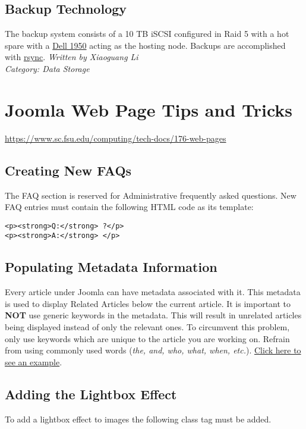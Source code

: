 \documentclass[12pt,a4paper]{article}
\begin{document}
\subsection*{Backup Technology}
The backup system consists of a 10 TB iSCSI configured in Raid 5 with a hot spare with a \href{http://www.dell.com/us/en/k-12/servers/pedge_1950/pd.aspx?refid=pedge_1950&cs=22&s=k12}{Dell 1950} acting as the hosting node. Backups are accomplished with \href{http://samba.anu.edu.au/rsync/}{rsync}.
\hfill \textit{Written by Xiaoguang Li} \\
\hfill \textit{Category: Data Storage}

\section{Joomla Web Page Tips and Tricks}
\url{https://www.sc.fsu.edu/computing/tech-docs/176-web-pages}

\subsection*{Creating New FAQs}
The FAQ section is reserved for Administrative frequently asked questions. New FAQ entries must contain the following HTML code as its template:
\begin{verbatim}
<p><strong>Q:</strong> ?</p>
<p><strong>A:</strong> </p>
\end{verbatim}

\subsection*{Populating Metadata Information}
Every article under Joomla can have metadata associated with it. This metadata is used to display Related Articles below the current article. It is important to \textbf{NOT} use generic keywords in the metadata. This will result in unrelated articles being displayed instead of only the relevant ones. To circumvent this problem, only use keywords which are unique to the article you are working on. Refrain from using commonly used words (\textit{the, and, who, what, when, etc.}).
\href{http://www.sc.fsu.edu/images/stories/techdocs/joomla/metadata.png}{Click here to see an example}.

\subsection*{Adding the Lightbox Effect}
To add a lightbox effect to images the following class tag must be added.
\end{document}
